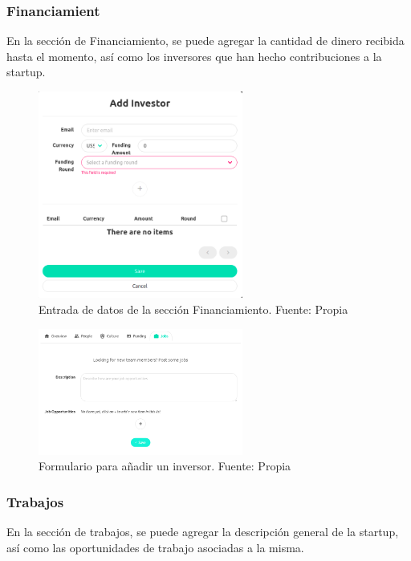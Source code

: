 \subsubsection{Financiamient}

En la sección de Financiamiento, se puede agregar la cantidad de dinero recibida hasta el momento, así como los inversores que han hecho contribuciones a la startup.

\begin{figure}[H]
\centering
\includegraphics[width=0.60\textwidth]{img/43.png}
\caption{
Entrada de datos de la sección Financiamiento. Fuente: Propia}
\label{figure:startupFunding}
\end{figure}


\begin{figure}[H]
\centering
\includegraphics[width=0.60\textwidth]{img/44.png}
\caption{Formulario para añadir un inversor. Fuente: Propia}
\label{figure:startupAddInvestor}
\end{figure}

\subsubsection{Trabajos}

En la sección de trabajos, se puede agregar la descripción general de la startup, así como las oportunidades de trabajo asociadas a la misma.


